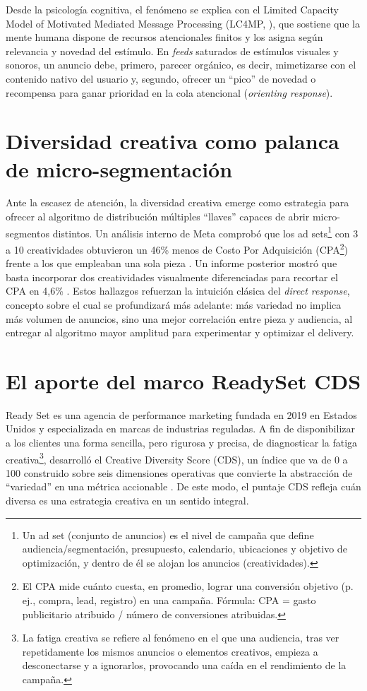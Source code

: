 \documentclass[12pt, a4paper]{report}
\begin{document}
Desde la psicología cognitiva, el fenómeno se explica con el Limited Capacity Model of
Motivated Mediated Message Processing (LC4MP, \citealt{lang2000}), que sostiene que la
mente humana dispone de recursos atencionales finitos y los asigna según relevancia
y novedad del estímulo. En \textit{feeds} saturados de estímulos visuales y
sonoros, un anuncio debe, primero, parecer orgánico, es decir, mimetizarse con el
contenido nativo del usuario y, segundo, ofrecer un ``pico'' de novedad o recompensa
para ganar prioridad en la cola atencional (\textit{orienting response}).

\section{Diversidad creativa como palanca de micro-segmentación}

Ante la escasez de atención, la diversidad creativa emerge como estrategia para
ofrecer al algoritmo de distribución múltiples ``llaves'' capaces de abrir
micro-segmentos distintos. Un análisis interno de Meta comprobó que los ad
sets\footnote{Un ad set (conjunto de anuncios) es el nivel de campaña que define audiencia/segmentación,
presupuesto, calendario, ubicaciones y objetivo de optimización, y dentro de él se alojan los anuncios
(creatividades).}
con 3 a 10 creatividades obtuvieron un 46\% menos de Costo Por Adquisición
(CPA\footnote{El CPA mide cuánto cuesta, en promedio, lograr una conversión objetivo (p. ej., compra, lead,
registro) en una campaña. Fórmula: CPA = gasto publicitario atribuido / número de conversiones atribuidas.})
frente a los que empleaban una sola pieza \citep{meta2024a}. Un informe posterior
mostró que basta incorporar dos creatividades visualmente diferenciadas para
recortar el CPA en 4,6\% \citep{meta2024b}. Estos hallazgos refuerzan la intuición
clásica del \textit{direct response}, concepto sobre el cual se profundizará más adelante:
más variedad no implica más volumen de anuncios, sino una mejor correlación entre
pieza y audiencia, al entregar al algoritmo mayor amplitud para experimentar y
optimizar el delivery.

\section{El aporte del marco ReadySet CDS}

Ready Set es una agencia de performance marketing fundada en 2019 en Estados
Unidos y especializada en marcas de industrias reguladas. A fin de disponibilizar a
los clientes una forma sencilla, pero rigurosa y precisa, de diagnosticar la fatiga
creativa\footnote{La fatiga creativa se refiere al fenómeno en el que una audiencia, tras ver repetidamente los
mismos anuncios o elementos creativos, empieza a desconectarse y a ignorarlos, provocando una
caída en el rendimiento de la campaña.}, desarrolló el Creative Diversity Score (CDS), un índice que va de 0 a 100
construido sobre seis dimensiones operativas que convierte la abstracción de
``variedad'' en una métrica accionable \citep{readyset2025}. De este modo, el puntaje
CDS refleja cuán diversa es una estrategia creativa en un sentido integral.
\end{document}
